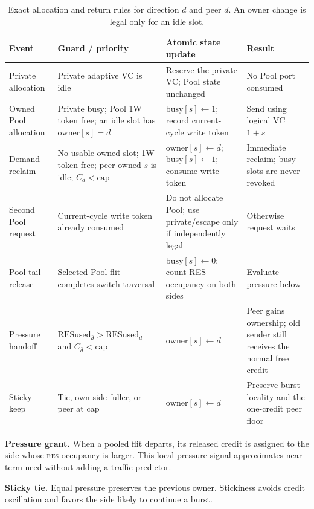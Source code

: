 \documentclass[10pt,twocolumn]{article}
\newcommand{\res}{\textsc{res}\xspace}
\begin{document}
\begin{table}[t]
\centering
\caption{Exact allocation and return rules for direction $d$ and peer
$\bar d$. An owner change is legal only for an idle slot.}
\label{tab:credit-rules}
\small
\begin{tabularx}{\textwidth}{@{}P{0.15\textwidth}P{0.29\textwidth}P{0.31\textwidth}Y@{}}
\toprule
Event & Guard / priority & Atomic state update & Result\\
\midrule
Private allocation &
Private adaptive VC is idle &
Reserve the private VC; Pool state unchanged &
No Pool port consumed\\
Owned Pool allocation &
Private busy; Pool 1W token free; an idle slot has
\(\mathrm{owner}[s]=d\) &
\(\mathrm{busy}[s]\leftarrow1\); record current-cycle write token &
Send using logical VC \(1+s\)\\
Demand reclaim &
No usable owned slot; 1W token free; peer-owned \(s\) is idle;
\(C_d<\mathrm{cap}\) &
\(\mathrm{owner}[s]\leftarrow d\);
\(\mathrm{busy}[s]\leftarrow1\); consume write token &
Immediate reclaim; busy slots are never revoked\\
Second Pool request &
Current-cycle write token already consumed &
Do not allocate Pool; use private/escape only if independently legal &
Otherwise request waits\\
Pool tail release &
Selected Pool flit completes switch traversal &
\(\mathrm{busy}[s]\leftarrow0\); count RES occupancy on both sides &
Evaluate pressure below\\
Pressure handoff &
\(\mathrm{RESused}_{\bar d}>\mathrm{RESused}_d\) and
\(C_{\bar d}<\mathrm{cap}\) &
\(\mathrm{owner}[s]\leftarrow\bar d\) &
Peer gains ownership; old sender still receives the normal free credit\\
Sticky keep &
Tie, own side fuller, or peer at cap &
\(\mathrm{owner}[s]\leftarrow d\) &
Preserve burst locality and the one-credit peer floor\\
\bottomrule
\end{tabularx}
\end{table}

\textbf{Pressure grant.} When a pooled flit departs, its released credit is
assigned to the side whose \res occupancy is larger. This local pressure
signal approximates near-term need without adding a traffic predictor.

\textbf{Sticky tie.} Equal pressure preserves the previous owner. Stickiness
avoids credit oscillation and favors the side likely to continue a burst.
\end{document}
